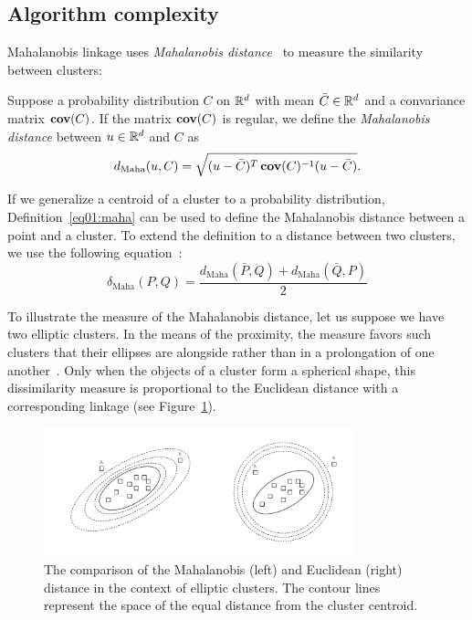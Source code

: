 \subsection{Algorithm complexity}

Mahalanobis linkage uses \emph{Mahalanobis distance}~\cite{mahalanobis1936generalized} to measure the similarity between clusters:
\begin{defn}
    Suppose a probability distribution $C$ on $\mathbb{R}^d$ with mean $\bar{C} \in \mathbb{R}^d$ and a convariance matrix $\operatorname{\textbf{cov}}(C)$. If the matrix $\operatorname{\textbf{cov}}(C)$ is regular, we define the \emph{Mahalanobis distance} between $u \in \mathbb{R}^d$ and $C$ as
    \begin{equation}
    d_\text{Maha}(u,C) = \sqrt{(u-\bar{C})^T\operatorname{\textbf{cov}}(C)^{-1}(u-\bar{C})}.
    \end{equation}\label{eq01:maha}
\end{defn}

If we generalize a centroid of a cluster to a probability distribution, Definition~\ref{eq01:maha} can be used to define the Mahalanobis distance between a point and a cluster. To extend the definition to a distance between two clusters, we use the following equation~\cite{fivser2012detection}:
\begin{equation}
    \delta_\text{Maha}(P,Q) = \frac{d_\text{Maha}(\bar{P},Q) + d_\text{Maha}(\bar{Q},P)}{2}
\end{equation}\label{eq01:maha_linkage}

To illustrate the measure of the Mahalanobis distance, let us suppose we have two elliptic clusters. In the means of the proximity, the measure favors such clusters that their ellipses are alongside rather than in a prolongation of one another~\cite{dagnelie1991using}. 
Only when the objects of a cluster form a spherical shape, this dissimilarity measure is proportional to the Euclidean distance with a corresponding linkage (see Figure~\ref{fig:ellipses}).

\begin{figure}[h]
    \centering
    \includegraphics[width=0.8\textwidth]{img/maha.drawio.pdf}
    \caption{The comparison of the Mahalanobis (left) and Euclidean (right) distance in the context of elliptic clusters. The contour lines represent the space of the equal distance from the cluster centroid.}
    \label{fig:ellipses}
\end{figure}

